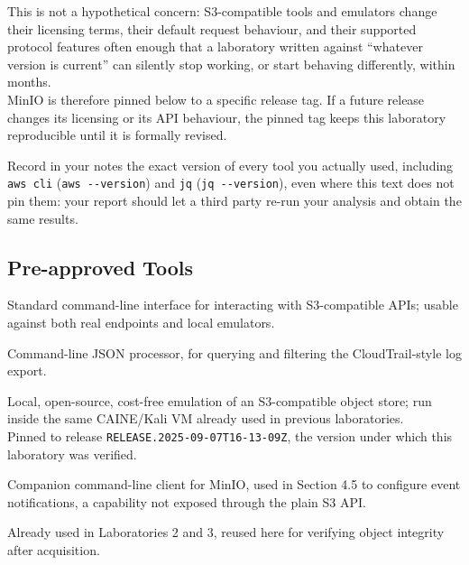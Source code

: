 \noindent
This is not a hypothetical concern: S3-compatible tools and emulators change their licensing terms, their default request behaviour, and their supported protocol features often enough that a laboratory written against ``whatever version is current'' can silently stop working, or start behaving differently, within months.\\
MinIO is therefore pinned below to a specific release tag. If a future release changes its licensing or its API behaviour, the pinned tag keeps this laboratory reproducible until it is formally revised.

\noindent
Record in your notes the exact version of every tool you actually used, including \texttt{aws cli}
(\texttt{aws -\/-version}) and \texttt{jq} (\texttt{jq -\/-version}), even where this text does not
pin them: your report should let a third party re-run your analysis and obtain the same results.

\subsection{Pre-approved Tools}

\begin{description}[leftmargin=1.5cm, style=nextline]
	\item[\texttt{aws cli}] Standard command-line interface for interacting with S3-compatible
	      APIs; usable against both real endpoints and local emulators.
	\item[\texttt{jq}] Command-line JSON processor, for querying and filtering the CloudTrail-style
	      log export.
	\item[MinIO (Docker)] Local, open-source, cost-free emulation of an S3-compatible object
	      store; run inside the same CAINE/Kali VM already used in previous laboratories.\\
		  Pinned to release \texttt{RELEASE.2025-09-07T16-13-09Z}, the version under which this
		  laboratory was verified.
	\item[\texttt{mc} (MinIO Client)] Companion command-line client for MinIO, used in Section 4.5
	      to configure event notifications, a capability not exposed through the plain S3 API.
	\item[\texttt{sha256sum}] Already used in Laboratories 2 and 3, reused here for verifying
	      object integrity after acquisition.
\end{description}